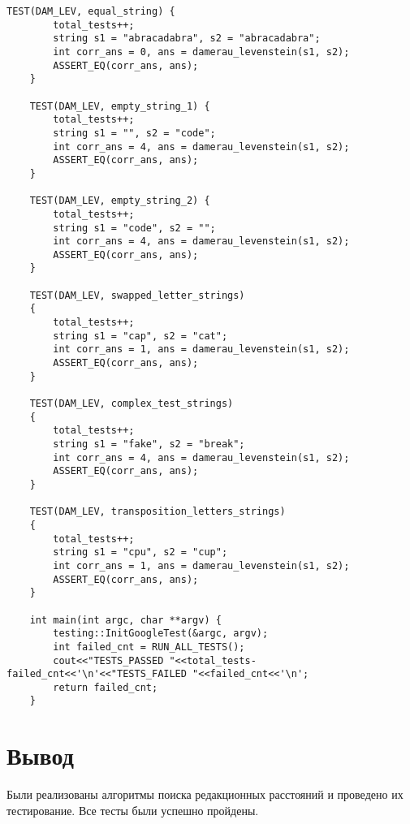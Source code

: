 \begin{lstlisting}[caption={Тестовый набор и запуск модульных тестов}, label=lst:mod_tests]
	TEST(DAM_LEV, equal_string) {
		total_tests++;
		string s1 = "abracadabra", s2 = "abracadabra";
		int corr_ans = 0, ans = damerau_levenstein(s1, s2);
		ASSERT_EQ(corr_ans, ans);
	}
	
	TEST(DAM_LEV, empty_string_1) {
		total_tests++;
		string s1 = "", s2 = "code";
		int corr_ans = 4, ans = damerau_levenstein(s1, s2);
		ASSERT_EQ(corr_ans, ans);
	}
	
	TEST(DAM_LEV, empty_string_2) {
		total_tests++;
		string s1 = "code", s2 = "";
		int corr_ans = 4, ans = damerau_levenstein(s1, s2);
		ASSERT_EQ(corr_ans, ans);
	}
	
	TEST(DAM_LEV, swapped_letter_strings)
	{
		total_tests++;
		string s1 = "cap", s2 = "cat";
		int corr_ans = 1, ans = damerau_levenstein(s1, s2);
		ASSERT_EQ(corr_ans, ans);
	}
	
	TEST(DAM_LEV, complex_test_strings)
	{
		total_tests++;
		string s1 = "fake", s2 = "break";
		int corr_ans = 4, ans = damerau_levenstein(s1, s2);
		ASSERT_EQ(corr_ans, ans);
	}
	
	TEST(DAM_LEV, transposition_letters_strings)
	{
		total_tests++;
		string s1 = "cpu", s2 = "cup";
		int corr_ans = 1, ans = damerau_levenstein(s1, s2);
		ASSERT_EQ(corr_ans, ans);
	}
	
	int main(int argc, char **argv) {
		testing::InitGoogleTest(&argc, argv);
		int failed_cnt = RUN_ALL_TESTS();
		cout<<"TESTS_PASSED "<<total_tests-failed_cnt<<'\n'<<"TESTS_FAILED "<<failed_cnt<<'\n';
		return failed_cnt;
	}
\end{lstlisting}
\section*{Вывод}

Были реализованы алгоритмы поиска редакционных расстояний и проведено их тестирование. Все тесты были успешно пройдены.

\clearpage